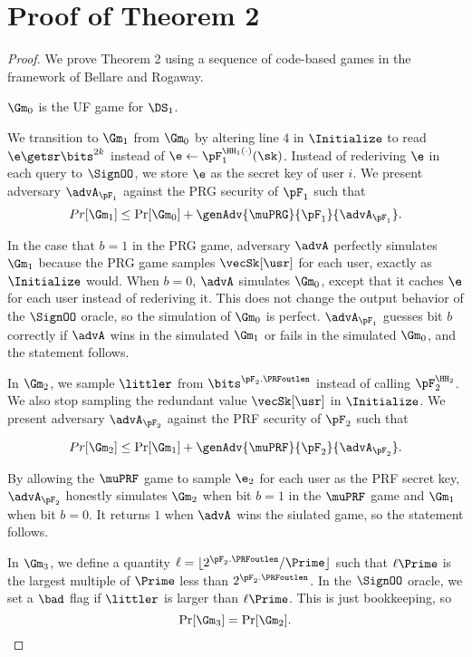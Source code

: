 \section{Proof of Theorem 2}
\begin{proof}
	We prove Theorem 2 using a sequence of code-based games in the framework of Bellare and Rogaway.
	
	$\Gm_0$ is the UF game for $\DS_1$. 
	
	We transition to $\Gm_1$ from $\Gm_0$ by altering line $4$ in $\Initialize$ to read $\e \getsr \bits^{2k}$ instead of $\e \gets \pF_1^{\HH_1(\cdot)}(\sk)$. Instead of rederiving $\e$ in each query to $\SignOO$, we store $\e$ as the secret key of user $i$. We present adversary $\advA_{\pF_1}$ against the PRG security of $\pF_1$ such that 
	\[Pr[\Gm_1] \leq \Pr[\Gm_0] +\genAdv{\muPRG}{\pF_1}{\advA_{\pF_1}}.\]
	
	
	In the case that $b=1$ in the PRG game, adversary $\advA$ perfectly simulates $\Gm_1$ because the PRG game samples $\vecSk[\usr]$ for each user, exactly as $\Initialize$ would. When $b=0$, $\advA$ simulates $\Gm_0$, except that it caches $\e$ for each user instead of rederiving it. This does not change the output behavior of the $\SignOO$ oracle, so the simulation of $\Gm_0$ is perfect. $\advA_{\pF_1}$ guesses bit $b$ correctly if $\advA$ wins in the simulated $\Gm_1$ or fails in the simulated $\Gm_0$, and the statement follows.
	
	In $\Gm_2$, we sample $\littler$ from $\bits^{\pF_2.\PRFoutlen}$ instead of calling $\pF_2^{\HH_2}$. We also stop sampling the redundant value $\vecSk[\usr]$ in $\Initialize$. We present adversary $\advA_{\pF_2}$ against the PRF security of $\pF_2$ such that
	
	\[Pr[\Gm_2] \leq \Pr[\Gm_1] +\genAdv{\muPRF}{\pF_2}{\advA_{\pF_2}}.\]
	
	By allowing the $\muPRF$ game to sample $\e_2$ for each user as the PRF secret key, $\advA_{\pF_2}$ honestly simulates $\Gm_2$ when bit $b = 1$ in the $\muPRF$ game and $\Gm_1$ when bit $b=0$. It returns $1$ when $\advA$ wins the siulated game, so the statement follows.
	
	
	In $\Gm_3$, we define a quantity $\ell = \lfloor 2^{\pF_2.\PRFoutlen}/\Prime \rfloor $ such that $\ell\Prime$ is the largest multiple of $\Prime$ less than $2^{\pF_2.\PRFoutlen}$. In the $\SignOO$ oracle, we set a $\bad$ flag  if $\littler$ is larger than $\ell\Prime$. This is just bookkeeping, so 
	\[ \Pr[\Gm_3] = \Pr[\Gm_2]. \]
	

\end{proof}
